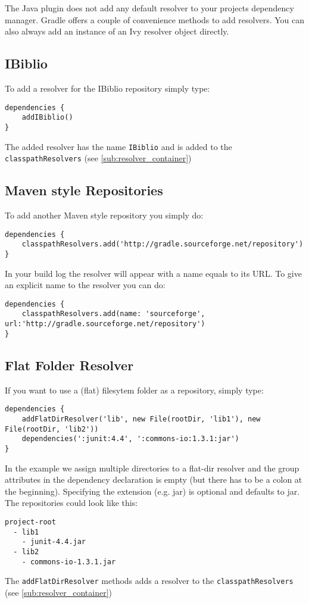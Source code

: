 The Java plugin does not add any default resolver to your projects dependency manager. Gradle offers a couple of convenience methods to add resolvers. You can also always add an instance of an Ivy resolver object directly.

\subsection{IBiblio} %
\label{sub:ibiblio}
To add a resolver for the IBiblio repository simply type:
\begin{Verbatim}
dependencies {
	addIBiblio()
}
\end{Verbatim}
The added resolver has the name \texttt{IBiblio} and is added to the \texttt{classpathResolvers} (see  \ref{sub:resolver_container})

\subsection{Maven style Repositories} %
\label{sub:maven_style_repositories}
To add another Maven style repository you simply do: 
\begin{Verbatim}
dependencies {
	classpathResolvers.add('http://gradle.sourceforge.net/repository')
}
\end{Verbatim}
In your build log the resolver will appear with a name equals to its URL. To give an explicit name to the resolver you can do:
\begin{Verbatim}
dependencies {
	classpathResolvers.add(name: 'sourceforge', url:'http://gradle.sourceforge.net/repository')
}
\end{Verbatim}  

\subsection{Flat Folder Resolver} %
\label{sub:flat_folder_resolver}
If you want to use a (flat) filesytem folder as a repository, simply type:
\begin{Verbatim}
dependencies {
	addFlatDirResolver('lib', new File(rootDir, 'lib1'), new File(rootDir, 'lib2'))
	dependencies(':junit:4.4', ':commons-io:1.3.1:jar')
}
\end{Verbatim}
In the example we assign multiple directories to a flat-dir resolver and the group attributes in the dependency declaration is empty (but there has to be a colon at the beginning). Specifying the extension (e.g. jar) is optional and defaults to jar. The repositories could look like this:
\begin{Verbatim}
project-root
  - lib1
    - junit-4.4.jar
  - lib2
    - commons-io-1.3.1.jar	
\end{Verbatim}
The \texttt{addFlatDirResolver} methods adds a resolver to the \texttt{classpathResolvers} (see  \ref{sub:resolver_container})

